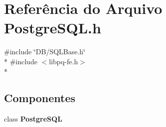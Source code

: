 \section{Referência do Arquivo Postgre\+S\+Q\+L.\+h}
\label{_postgre_s_q_l_8h}
{\ttfamily \#include \char`\"{}D\+B/\+S\+Q\+L\+Base.\+h\char`\"{}}\\*
{\ttfamily \#include $<$libpq-\/fe.\+h$>$}\\*
\subsection*{Componentes}
\begin{DoxyCompactItemize}
\item 
class {\bf Postgre\+S\+QL}
\end{DoxyCompactItemize}
